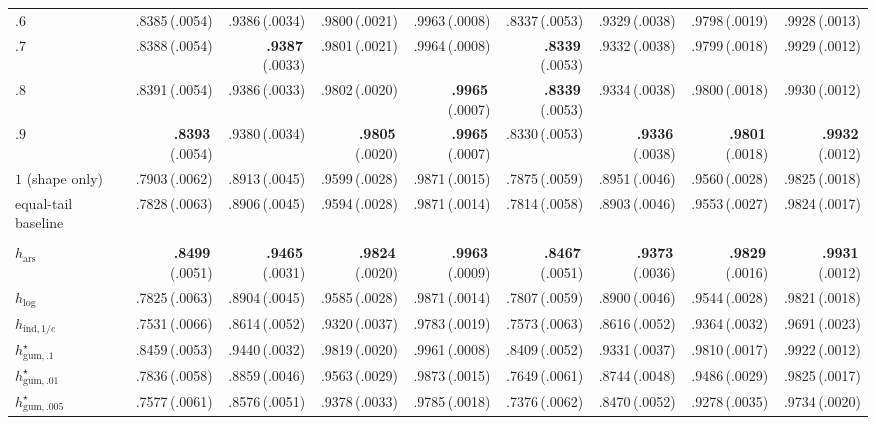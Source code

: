 \documentclass[11pt]{article}
\newcommand{\mcse}[2]{\mbox{#1\,{\fontsize{7}{8}\selectfont(#2)}}}
\newcommand{\bestmcse}[2]{\mbox{\textbf{#1}\,{\fontsize{7}{8}\selectfont(#2)}}}
\begin{document}
\begin{table}[htbp]
\begin{tabular}{@{}lrrrrrrrr@{}}
$.6$ & \mcse{.8385}{.0054} & \mcse{.9386}{.0034} & \mcse{.9800}{.0021} & \mcse{.9963}{.0008} & \mcse{.8337}{.0053} & \mcse{.9329}{.0038} & \mcse{.9798}{.0019} & \mcse{.9928}{.0013} \\
$.7$ & \mcse{.8388}{.0054} & \bestmcse{.9387}{.0033} & \mcse{.9801}{.0021} & \mcse{.9964}{.0008} & \bestmcse{.8339}{.0053} & \mcse{.9332}{.0038} & \mcse{.9799}{.0018} & \mcse{.9929}{.0012} \\
$.8$ & \mcse{.8391}{.0054} & \mcse{.9386}{.0033} & \mcse{.9802}{.0020} & \bestmcse{.9965}{.0007} & \bestmcse{.8339}{.0053} & \mcse{.9334}{.0038} & \mcse{.9800}{.0018} & \mcse{.9930}{.0012} \\
$.9$ & \bestmcse{.8393}{.0054} & \mcse{.9380}{.0034} & \bestmcse{.9805}{.0020} & \bestmcse{.9965}{.0007} & \mcse{.8330}{.0053} & \bestmcse{.9336}{.0038} & \bestmcse{.9801}{.0018} & \bestmcse{.9932}{.0012} \\
$1$ (shape only) & \mcse{.7903}{.0062} & \mcse{.8913}{.0045} & \mcse{.9599}{.0028} & \mcse{.9871}{.0015} & \mcse{.7875}{.0059} & \mcse{.8951}{.0046} & \mcse{.9560}{.0028} & \mcse{.9825}{.0018} \\
\addlinespace
equal-tail baseline & \mcse{.7828}{.0063} & \mcse{.8906}{.0045} & \mcse{.9594}{.0028} & \mcse{.9871}{.0014} & \mcse{.7814}{.0058} & \mcse{.8903}{.0046} & \mcse{.9553}{.0027} & \mcse{.9824}{.0017} \\
\addlinespace
\multicolumn{9}{@{}l}{\textit{Reference scores}}\\
$h_{\mathrm{ars}}$ & \bestmcse{.8499}{.0051} & \bestmcse{.9465}{.0031} & \bestmcse{.9824}{.0020} & \bestmcse{.9963}{.0009} & \bestmcse{.8467}{.0051} & \bestmcse{.9373}{.0036} & \bestmcse{.9829}{.0016} & \bestmcse{.9931}{.0012} \\
$h_{\log}$ & \mcse{.7825}{.0063} & \mcse{.8904}{.0045} & \mcse{.9585}{.0028} & \mcse{.9871}{.0014} & \mcse{.7807}{.0059} & \mcse{.8900}{.0046} & \mcse{.9544}{.0028} & \mcse{.9821}{.0018} \\
$h_{\mathrm{ind},1/e}$ & \mcse{.7531}{.0066} & \mcse{.8614}{.0052} & \mcse{.9320}{.0037} & \mcse{.9783}{.0019} & \mcse{.7573}{.0063} & \mcse{.8616}{.0052} & \mcse{.9364}{.0032} & \mcse{.9691}{.0023} \\
$h^\star_{\mathrm{gum},.1}$ & \mcse{.8459}{.0053} & \mcse{.9440}{.0032} & \mcse{.9819}{.0020} & \mcse{.9961}{.0008} & \mcse{.8409}{.0052} & \mcse{.9331}{.0037} & \mcse{.9810}{.0017} & \mcse{.9922}{.0012} \\
$h^\star_{\mathrm{gum},.01}$ & \mcse{.7836}{.0058} & \mcse{.8859}{.0046} & \mcse{.9563}{.0029} & \mcse{.9873}{.0015} & \mcse{.7649}{.0061} & \mcse{.8744}{.0048} & \mcse{.9486}{.0029} & \mcse{.9825}{.0017} \\
$h^\star_{\mathrm{gum},.005}$ & \mcse{.7577}{.0061} & \mcse{.8576}{.0051} & \mcse{.9378}{.0033} & \mcse{.9785}{.0018} & \mcse{.7376}{.0062} & \mcse{.8470}{.0052} & \mcse{.9278}{.0035} & \mcse{.9734}{.0020} \\
\bottomrule
\end{tabular}
\end{table}
\end{document}

